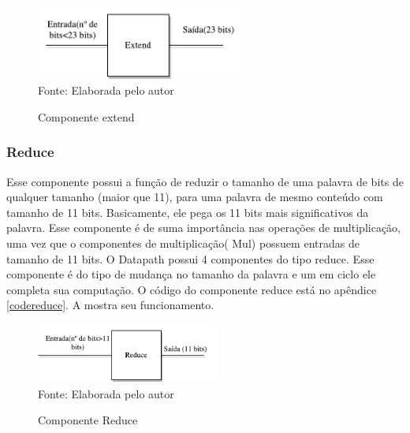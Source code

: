 \begin{figure}[H]
	\centering
	\caption{Componente extend}
	\includegraphics[width=7cm]{figures/Extend.pdf}\\
	
	{Fonte: Elaborada pelo autor}
	\label{extend}
\end{figure}


\subsubsection{Reduce}
Esse componente possui a função de reduzir o tamanho de uma palavra de bits de qualquer tamanho (maior que 11), para uma palavra de mesmo conteúdo com tamanho de 11 bits. Basicamente, ele pega os 11 bits mais significativos da palavra. Esse componente é de suma importância nas operações de multiplicação, uma vez que o componentes de multiplicação( Mul) possuem entradas de tamanho de 11 bits. O Datapath possui 4 componentes do tipo reduce. Esse componente é do tipo de mudança no tamanho da palavra e um em ciclo ele completa sua computação. O código do componente reduce está no apêndice \ref{codereduce}. A  mostra seu funcionamento.


\begin{figure}[H]
	\centering
	\caption{Componente Reduce}
	\includegraphics[width=6cm]{figures/Reduce.pdf}\\
	
	{Fonte: Elaborada pelo autor}
	\label{reduce}
\end{figure}


